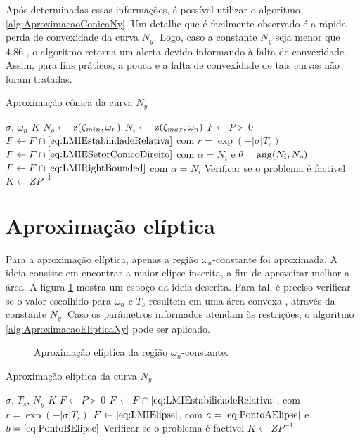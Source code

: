 Após determinadas essas informações, é possível utilizar o algoritmo \ref{alg:AproximacaoConicaNy}. Um detalhe que é facilmente observado é a rápida perda de convexidade da curva $N_y$. Logo, caso a constante $N_y$ seja menor que $4.86$ \cite{CHIQUETO2021}, o algoritmo retorna um alerta devido informando à falta de convexidade. Assim, para fins práticos, a pouca e a falta de convexidade de tais curvas não foram tratadas.
\begin{algorithm}[hb!]
  \caption{Aproximação cônica da curva $N_y$}\label{alg:AproximacaoConicaNy}
  \begin{algorithmic}[1]
    \Require $\sigma$, $\omega_n$
    \Ensure $K$
    \State $N_o \gets $ $\operatorname{\mathrm{z}}(\zeta_{min},\omega_n)$
    \State $N_i \gets $ $\operatorname{\mathrm{z}}(\zeta_{max},\omega_n)$
    \State $F \gets P \succ 0$
    \State $F \gets F \cap \eqref{eq:LMIEstabilidadeRelativa}$ com $r = \exp{\left(-|\sigma|T_s\right)}$ 
    \State $F \gets F \cap \eqref{eq:LMIESetorConicoDireito}$ com $\alpha = N_i$ e $\theta = \operatorname{ang}(N_i,N_o)$ 
    \State $F \gets F \cap \eqref{eq:LMIRightBounded}$ com $\alpha = N_i$ 
    \State Verificar se o problema é factível
    \State $K \gets ZP^{-1}$
  \end{algorithmic}
\end{algorithm}

\section{Aproximação elíptica}
Para a aproximação elíptica, apenas a região $\omega_n$-constante foi aproximada. A ideia consiste em encontrar a maior elipse inscrita, a fim de aproveitar melhor a área. A figura \ref{fig:AproximacaoEliptica} mostra um esboço da ideia descrita. Para tal, é preciso verificar se o valor escolhido para $\omega_n$ e $T_s$ resultem em uma área convexa \cite{CHIQUETO2021}, através da constante $N_y$. Caso os parâmetros informados atendam às restrições, o algoritmo \ref{alg:AproximacaoElipticaNy} pode ser aplicado.
\begin{figure}[!ht]
  \centering
  
  \caption{Aproximação elíptica da região $\omega_n$-constante.}
  \label{fig:AproximacaoEliptica}
\end{figure}

\begin{algorithm}[hb!]
  \caption{Aproximação elíptica da curva $N_y$}\label{alg:AproximacaoElipticaNy}
  \begin{algorithmic}[1]
    \Require $\sigma$, $T_s$, $N_y$
    \Ensure $K$
    \State $F \gets P \succ 0$
    \State $F \gets F \cap \eqref{eq:LMIEstabilidadeRelativa}$, com $r = \exp{\left(-|\sigma|T_s\right)}$ 
    \State $F \gets \eqref{eq:LMIElipse}$, com $a = \eqref{eq:PontoAElipse}$ e $b = \eqref{eq:PontoBElipse}$ 
    \State Verificar se o problema é factível
    \State $K \gets ZP^{-1}$
  \end{algorithmic}
\end{algorithm}

